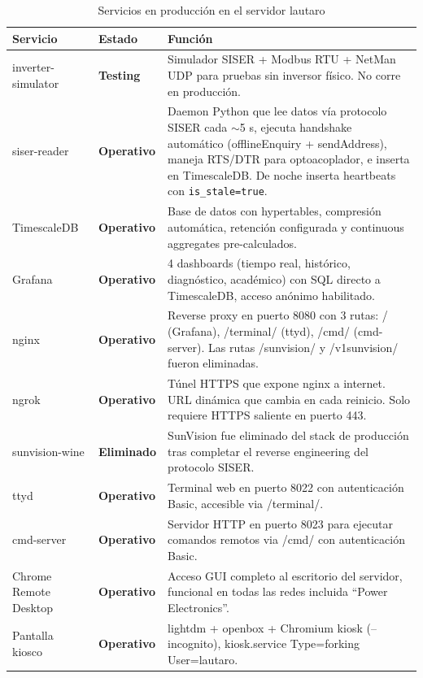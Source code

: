 \documentclass[12pt,a4paper]{article}
\begin{document}
\begin{table}[H]
\centering
\begin{tabular}{llp{6.5cm}}
\toprule
\textbf{Servicio} & \textbf{Estado} & \textbf{Funci\'on} \\
\midrule
inverter-simulator & \textbf{Testing} & Simulador SISER + Modbus RTU + NetMan UDP para pruebas sin inversor f\'isico. No corre en producci\'on. \\
siser-reader & \textbf{Operativo} & Daemon Python que lee datos v\'ia protocolo SISER cada $\sim$5 s, ejecuta handshake autom\'atico (offlineEnquiry + sendAddress), maneja RTS/DTR para optoacoplador, e inserta en TimescaleDB. De noche inserta heartbeats con \texttt{is\_stale=true}. \\
TimescaleDB & \textbf{Operativo} & Base de datos con hypertables, compresi\'on autom\'atica, retenci\'on configurada y continuous aggregates pre-calculados. \\
Grafana & \textbf{Operativo} & 4 dashboards (tiempo real, hist\'orico, diagn\'ostico, acad\'emico) con SQL directo a TimescaleDB, acceso an\'onimo habilitado. \\
nginx & \textbf{Operativo} & Reverse proxy en puerto 8080 con 3 rutas: / (Grafana), /terminal/ (ttyd), /cmd/ (cmd-server). Las rutas /sunvision/ y /v1sunvision/ fueron eliminadas. \\
ngrok & \textbf{Operativo} & T\'unel HTTPS que expone nginx a internet. URL din\'amica que cambia en cada reinicio. Solo requiere HTTPS saliente en puerto 443. \\
sunvision-wine & \textbf{Eliminado} & SunVision fue eliminado del stack de producci\'on tras completar el reverse engineering del protocolo SISER. \\
ttyd & \textbf{Operativo} & Terminal web en puerto 8022 con autenticaci\'on Basic, accesible via /terminal/. \\
cmd-server & \textbf{Operativo} & Servidor HTTP en puerto 8023 para ejecutar comandos remotos via /cmd/ con autenticaci\'on Basic. \\
Chrome Remote Desktop & \textbf{Operativo} & Acceso GUI completo al escritorio del servidor, funcional en todas las redes incluida ``Power Electronics''. \\
Pantalla kiosco & \textbf{Operativo} & lightdm + openbox + Chromium kiosk (--incognito), kiosk.service Type=forking User=lautaro. \\
\bottomrule
\end{tabular}
\caption{Servicios en producci\'on en el servidor lautaro}
\end{table}
\end{document}
